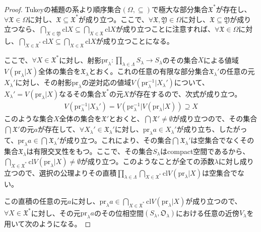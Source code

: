\documentclass[dvipdfmx]{jsarticle}
\begin{document}
\begin{proof}
Tukeyの補題の系より順序集合$(\varOmega, \subseteq )$で極大な部分集合$\mathfrak{X}^{*}$が存在し、$\mathfrak{\forall X \in}\varOmega$に対し、$\mathfrak{X \subseteq}\mathfrak{X}^{*}$が成り立つ。ここで、$\mathfrak{\forall X,Y \in}\varOmega$に対し、$\mathfrak{X \subseteq Y}$が成り立つなら、$\bigcap_{X \in \mathfrak{Y}} {{\mathrm{cl}}X} \subseteq \bigcap_{X \in \mathfrak{X}} {{\mathrm{cl}}X}$が成り立つことに注意すれば、$\mathfrak{\forall X \in}\varOmega$に対し、$\bigcap_{X \in \mathfrak{X}^{*}} {{\mathrm{cl}}X} \subseteq \bigcap_{X \in \mathfrak{X}} {{\mathrm{cl}}X}$が成り立つことになる。\par
ここで、$\forall X \in \mathfrak{X}^{*}$に対し、射影${\mathrm{pr}}_{\lambda}:\prod_{\lambda \in \varLambda} S_{\lambda} \rightarrow S_{\lambda}$のその集合$X$による値域$V\left( {\mathrm{pr}}_{\lambda}|X \right)$全体の集合を$\mathfrak{X}_{\lambda}$とおく。これの任意の有限な部分集合$\mathfrak{X}_{\lambda}'$の任意の元$X_{\lambda}'$に対し、その射影${\mathrm{pr}}_{\lambda}$の逆対応の値域$V\left( {\mathrm{pr}}_{\lambda}^{- 1}|X_{\lambda}' \right)$について、$X_{\lambda}' = V\left( {\mathrm{pr}}_{\lambda}|X \right)$なるその集合$\mathfrak{X}^{*}$の元$X$が存在するので、次式が成り立つ。
\begin{align*}
V\left( {\mathrm{pr}}_{\lambda}^{- 1}|X_{\lambda}' \right) = V\left( {\mathrm{pr}}_{\lambda}^{- 1}|V\left( {\mathrm{pr}}_{\lambda}|X \right) \right) \supseteq X
\end{align*}
このような集合$X$全体の集合を$\mathfrak{X}'$とおくと、$\bigcap_{} \mathfrak{X}' \neq \emptyset$が成り立つので、その集合$\bigcap_{} \mathfrak{X}'$の元$a$が存在して、$\forall X_{\lambda}' \in \mathfrak{X}_{\lambda}'$に対し、${\mathrm{pr}}_{\lambda}a \in X_{\lambda}'$が成り立ち、したがって、${\mathrm{pr}}_{\lambda}a \in \bigcap_{} \mathfrak{X}_{\lambda}'$が成り立つ。これにより、その集合$\bigcap_{} \mathfrak{X}_{\lambda}'$は空集合でなくその集合$\mathfrak{X}_{\lambda}$は有限交叉性をもつ。ここで、その集合$S_{\lambda}$はcompact空間であるから、$\bigcap_{X \in \mathfrak{X}^{*}} {{\mathrm{cl}}{V\left( {\mathrm{pr}}_{\lambda}|X \right)}} \neq \emptyset$が成り立つ。このようなことが全ての添数$\lambda$に対し成り立つので、選択の公理よりその直積$\prod_{\lambda \in \varLambda} {\bigcap_{X \in \mathfrak{X}^{*}} {{\mathrm{cl}}{V\left( {\mathrm{pr}}_{\lambda}|X \right)}}}$は空集合でない。\par
この直積の任意の元$a$に対し、${\mathrm{pr}}_{\lambda}a \in \bigcap_{X \in \mathfrak{X}^{*}} {{\mathrm{cl}}{V\left( {\mathrm{pr}}_{\lambda}|X \right)}}$が成り立つので、$\forall X \in \mathfrak{X}^{*}$に対し、その元${\mathrm{pr}}_{\lambda}a$のその位相空間$\left( S_{\lambda},\mathfrak{O}_{\lambda} \right)$における任意の近傍$V_{\lambda}$を用いて次のようになる。

\end{proof}
\end{document}
